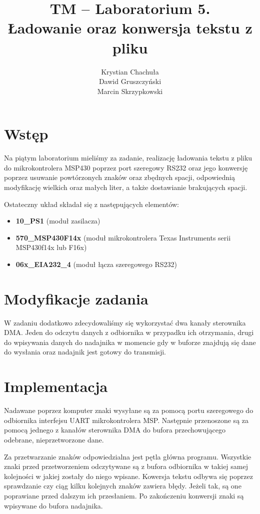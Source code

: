 \documentclass[fleqn]{article}
\title{TM -- Laboratorium 5. \\ \large Ładowanie oraz konwersja tekstu z pliku}
\author{Krystian Chachuła \\ Dawid Gruszczyński \\ Marcin Skrzypkowski}
\begin{document}
\maketitle

\setcounter{page}{0}
\thispagestyle{empty}

\pagebreak

\setcounter{page}{1}

\section{Wstęp}
Na piątym laboratorium mieliśmy za zadanie, realizację ładowania tekstu z pliku do mikrokontrolera MSP430 poprzez port szeregowy RS232 oraz jego konwersję poprzez usuwanie powtórzonych znaków oraz zbędnych spacji, odpowiednią modyfikację wielkich oraz małych liter, a także dostawianie brakujących spacji.


Ostateczny układ składał się z następujących elementów:

\begin{itemize}
	\item \textbf{10\_PS1} (moduł zasilacza)
	\item \textbf{570\_MSP430F14x} (moduł mikrokontrolera Texas Instruments serii MSP430f14x lub F16x)
	\item \textbf{06x\_EIA232\_4} (moduł łącza szeregowego RS232)
\end{itemize}

\section{Modyfikacje zadania}
W zadaniu dodatkowo zdecydowaliśmy się wykorzystać dwa kanały sterownika DMA. Jeden do odczytu danych z odbiornika w przypadku ich otrzymania, drugi do wpisywania danych do nadajnika w momencie gdy w buforze znajdują się dane do wysłania oraz nadajnik jest gotowy do transmisji.



\section{Implementacja}
Nadawane poprzez komputer znaki wysyłane są za pomocą portu szeregowego do odbiornika interfejsu UART mikrokontrolera MSP. Następnie przenoszone są za pomocą jednego z kanałów sterownika DMA do bufora przechowującego odebrane, nieprzetworzone dane.

Za przetwarzanie znaków odpowiedzialna jest pętla główna programu. Wszystkie znaki przed przetworzeniem odczytywane są z bufora odbiornika w takiej samej kolejności w jakiej zostały do niego wpisane. Kowersja tekstu odbywa się poprzez sprawdzanie czy ciąg kilku kolejnych znaków zawiera błędy. Jeżeli tak, są one poprawiane przed dalszym ich przesłaniem. Po zakończeniu konwersji znaki są wpisywane do bufora nadajnika.
\end{document}
